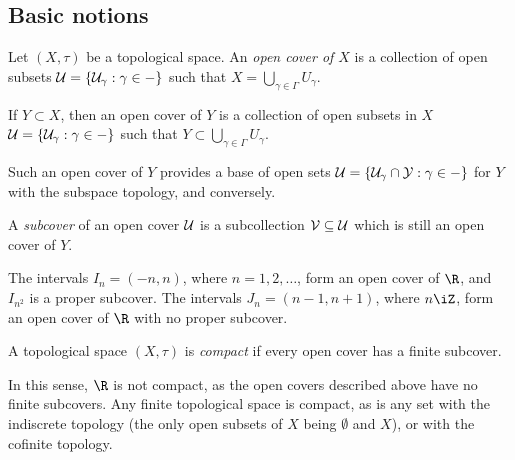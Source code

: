 \setcounter{lecture}{4}

\subsection{Basic notions} %
\label{sub:compact:basic_notions}

\begin{definition}
	Let $(X,\tau)$ be a topological space. An \emph{open cover of $X$} is a collection of open subsets $\cal{U}=\{U_\gamma:\gamma\in\Gamma\}$ such that $X=\bigcup_{\gamma\in\Gamma} U_\gamma$.
	
	If $Y\subset X$, then an open cover of $Y$ is a collection of open subsets in $X$ $\cal{U}=\{U_\gamma:\gamma\in\Gamma\}$ such that $Y\subset\bigcup_{\gamma\in\Gamma} U_\gamma$.
\end{definition}

\vspace{3pt}

\begin{remark}
	Such an open cover of $Y$ provides a base of open sets $\cal{U} = \{U_\gamma \cap Y: \gamma\in\Gamma\}$ for $Y$ with the subspace topology, and conversely.
\end{remark}

\vspace{-3pt}

\begin{definition}
	A \emph{subcover} of an open cover $\cal{U}$ is a subcollection $\cal{V} \subseteq \cal{U}$ which is still an open cover of $Y$.
\end{definition}

\begin{example}
	The intervals $I_n=(-n,n)$, where $n=1,2,\ldots$, form an open cover of $\R$, and $I_{n^2}$ is a proper subcover. The intervals $J_n = (n-1,n+1)$, where $n\iZ$, form an open cover of $\R$ with no proper subcover.
\end{example}

\begin{definition}
	A topological space $(X,\tau)$ is \emph{compact} if every open cover has a finite subcover.
\end{definition}

\begin{examples}
	In this sense, $\R$ is not compact, as the open covers described above have no finite subcovers. Any finite topological space is compact, as is any set with the indiscrete topology (the only open subsets of $X$ being $\emptyset$ and $X$), or with the cofinite topology.
\end{examples}

